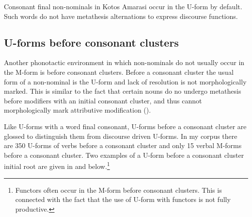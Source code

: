 \begin{exe}\let\eachwordtwo=\ve
	\label{ex:08/10/14, p.113}
	\label{ex:09/10/14, p.114}
\end{exe}

Consonant final non-nominals in Kotos
Amarasi occur in the U-form by default.
Such words do not have metathesis alternations
to express discourse functions.

\subsection{U-forms before consonant clusters}\label{sec:VerBefCC}
Another phonotactic environment in which non-nominals
do not usually occur in the M-form is before consonant clusters.
Before a consonant cluster the usual form of a non-nominal is
the U-form and lack of resolution is not morphologically marked.
This is similar to the fact that certain nouns do
no undergo metathesis before modifiers with an initial consonant cluster,
and thus cannot morphologically mark attributive modification ().

Like U-forms with a word final consonant, U-forms before a consonant cluster
are glossed {\Uc} to distinguish them from discourse driven U-forms.
In my corpus there are 350 U-forms of verbs before a consonant
cluster and only 15 verbal M-forms before a consonant cluster.
Two examples of a U-form before a consonant cluster initial root are given in
 and  below.\footnote{
		Functors often occur in the M-form before consonant clusters.
		This is connected with the fact that the use of U-form with
		functors is not fully productive.}

